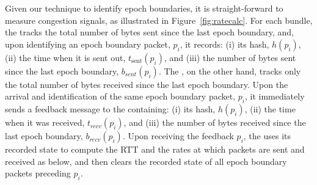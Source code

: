 Given our technique to identify epoch boundaries, it is straight-forward to measure congestion signals, as illustrated in Figure~\ref{fig:ratecalc}.
For each bundle, the \inbox tracks the total number of bytes sent since the last epoch boundary, and, upon identifying an epoch boundary packet, $p_i$, it records: (i) its hash, $h(p_i)$, (ii) the time when it is sent out, $t_{\text{sent}}(p_i)$, and (iii) the number of bytes sent since the last epoch boundary, $b_{sent}(p_i)$. 
The \outbox, on the other hand, tracks only the total number of bytes received since the last epoch boundary. Upon the arrival and identification of the same epoch boundary packet, $p_i$, it immediately sends a feedback message to the \inbox containing: (i) its hash, $h(p_i)$, (ii) the time when it was received, $t_{recv}(p_i)$, and (iii) the number of bytes received since the last epoch boundary, $b_{recv}(p_i)$. 
Upon receiving the feedback $p_i$, the \inbox uses its recorded state to compute the RTT and the rates at which packets are sent and received as below, and then clears the recorded state of all epoch boundary packets preceding $p_i$.

